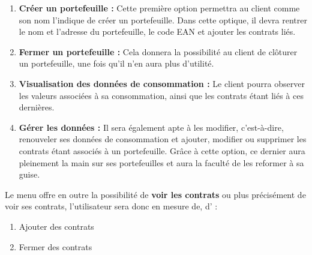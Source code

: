 \begin{enumerate}[-]
\item \textbf{Créer un portefeuille : }
\newline
Cette première option permettra au client comme son nom l’indique de créer un portefeuille. 
\newline
Dans cette optique, il devra rentrer le nom et l’adresse du portefeuille, le code EAN et ajouter les contrats liés.

\item \textbf{Fermer un portefeuille :}
\newline
Cela donnera la possibilité au client de clôturer un portefeuille, une fois qu’il n’en aura plus d’utilité.

\item \textbf{Visualisation des données de consommation :}
\newline
Le client pourra observer les valeurs associées à sa consommation, ainsi que les contrats étant liés à ces dernières.

\item \textbf{Gérer les données :} 
\newline
Il sera également apte à les modifier, c’est-à-dire, renouveler ses données de consommation et ajouter, modifier ou supprimer les contrats étant associés à un portefeuille.
\newline Grâce à cette option, ce dernier aura pleinement la main sur ses portefeuilles et aura la faculté de les reformer à sa guise.
\end{enumerate}

\newpage

\begin{flushleft}
Le menu offre en outre la possibilité de \textbf{voir les contrats} ou plus précisément de voir ses contrats, l’utilisateur sera donc en mesure de, d’ :
\end{flushleft}
\begin{enumerate}[1.]
\item Ajouter des contrats
\item Fermer des contrats
\end{enumerate}

